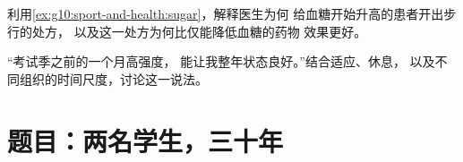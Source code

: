 \begin{exercise}[$\star\star\star$]\label{exo:g10:sport-and-health:14}
利用\cref{ex:g10:sport-and-health:sugar}，解释医生为何
给血糖开始升高的患者开出步行的处方，
以及这一处方为何比仅能降低血糖的药物
效果更好。
\end{exercise}

\begin{exercise}[$\star\star\star$]\label{exo:g10:sport-and-health:15}
“考试季之前的一个月高强度，
能让我整年状态良好。”结合适应、休息，
以及不同组织的时间尺度，讨论这一说法。
\end{exercise}

\section{题目：两名学生，三十年}

